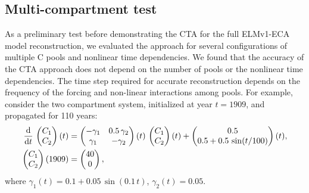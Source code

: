 \documentclass[11pt,a4paper]{article}
\newcommand{\deriv}[1]{\frac{\mathrm{d}}{\mathrm{d}#1}}
\begin{document}
\subsection{Multi-compartment test}
    As a preliminary test before demonstrating the CTA for the full ELMv1-ECA model reconstruction, we evaluated the approach for several configurations of multiple C pools and nonlinear time dependencies. We found that the accuracy of the CTA approach does not depend on the number of pools or the nonlinear time dependencies. The time step required for accurate reconstruction depends on the frequency of the forcing and non-linear interactions among pools. For example, consider the two compartment system, initialized at year $t=1909$, and propagated for 110 years:
    \begin{equation}\label{eqn:CS_two_dim_example}
        \begingroup\makeatletter\def\f@size{10}\check@mathfonts
        \begin{aligned}
            \deriv{t}\,\begin{pmatrix} C_1 \\ C_2 \end{pmatrix}(t) &= 
            \begin{pmatrix} -\gamma_1 & 0.5\,\gamma_2 \\ \gamma_1 & -\gamma_2 \end{pmatrix}(t)\,
            \begin{pmatrix} C_1 \\ C_2 \end{pmatrix}(t) + 
            \begin{pmatrix} 0.5 \\ 0.5 + 0.5\,\sin(t/100) \end{pmatrix}(t),\\
            \begin{pmatrix} C_1 \\ C_2 \end{pmatrix}(1909) &=
            \begin{pmatrix} 40 \\ 0 \end{pmatrix},
        \end{aligned}
        \endgroup
    \end{equation}
    where $\gamma_1(t)=0.1+0.05\,\sin(0.1\,t)$, $\gamma_2(t)=0.05$.
    
\end{document}
